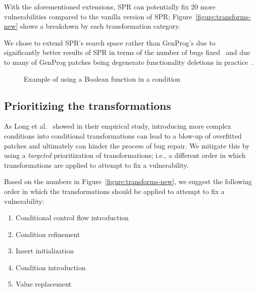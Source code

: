 With the aforementioned extensions, SPR can potentially fix 20 more vulnerabilities compared to the vanilla version of SPR; Figure~\ref{figure:transforms-new} shows a breakdown by each transformation category.

We chose to extend SPR's search space rather than GenProg's due to significantly better results of SPR in terms of the number of bugs fixed~\cite{long2015staged} and due to many of GenProg patches being degenerate functionality deletions in practice~\cite{qi2015analysis}.

\begin{figure}



\vspace{0.1in}
\small \caption{Example of using a Boolean function in a condition}
    \label{figure:new-ccfi}
\vspace{-0.2in}
\end{figure}

\subsection{Prioritizing the transformations}

As Long et al.~\cite{long2016analysis} showed in their empirical study, introducing more complex conditions into conditional transformations can lead to a blow-up of overfitted patches and ultimately can hinder the process of bug repair. We mitigate this by using a \emph{targeted} prioritization of transformations; i.e., a different order in which transformations are applied to attempt to fix a vulnerability.

Based on the numbers in Figure~\ref{figure:transforms-new}, we suggest the following order in which the transformations should be applied to attempt to fix a vulnerability:
\begin{enumerate}
    \item Conditional control flow introduction
    \item Condition refinement
    \item Insert initialization
    \item Condition introduction
    \item Value replacement
\end{enumerate}
